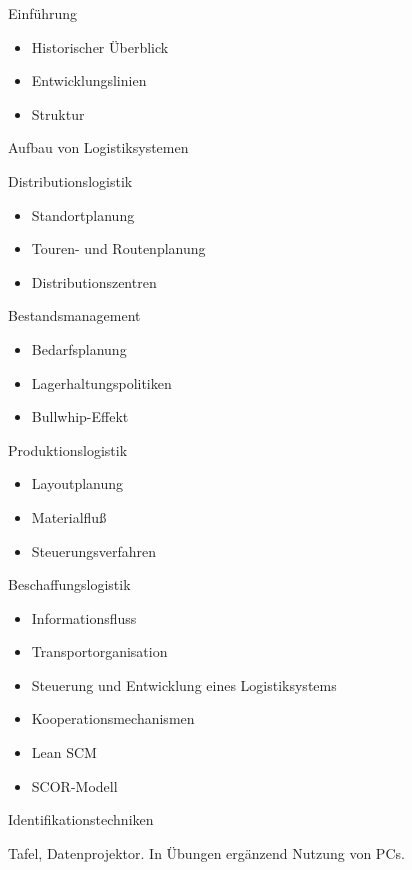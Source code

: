 \begin{course}
\begin{content}
Einführung

 \begin{itemize}\item Historischer Überblick  \item Entwicklungslinien  \item Struktur  \end{itemize}

Aufbau von Logistiksystemen

 

Distributionslogistik

 \begin{itemize}\item Standortplanung  \item Touren- und Routenplanung  \item Distributionszentren  \end{itemize}

Bestandsmanagement

 \begin{itemize}\item Bedarfsplanung  \item Lagerhaltungspolitiken  \item Bullwhip-Effekt  \end{itemize}

Produktionslogistik

 \begin{itemize}\item Layoutplanung  \item Materialfluß  \item Steuerungsverfahren  \end{itemize}

Beschaffungslogistik

 \begin{itemize}\item Informationsfluss  \item Transportorganisation  \item Steuerung und Entwicklung eines Logistiksystems  \item Kooperationsmechanismen  \item Lean SCM  \item SCOR-Modell  \end{itemize}

Identifikationstechniken


\end{content}

\begin{media}Tafel, Datenprojektor. In Übungen ergänzend Nutzung von PCs.


\end{media}
\end{course}
